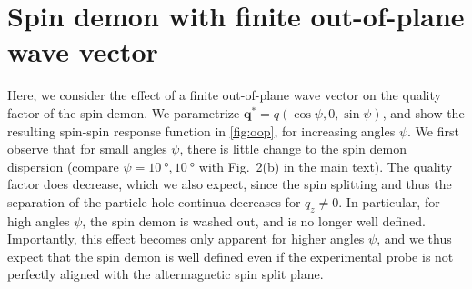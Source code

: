 \documentclass[aps,prb,reprint,twocolumns,superscriptaddress,nofootinbib]{revtex4-2}
\begin{document}
	
	
	\section{Spin demon with finite out-of-plane wave vector}
	Here, we consider the effect of a finite out-of-plane wave vector on the quality factor of the spin demon. We parametrize $\bm q^* = q(\cos\psi,0,\sin\psi)$, and show the resulting spin-spin response function in \cref{fig:oop}, for increasing angles $\psi$. We first observe that for small angles $\psi$, there is little change to the spin demon dispersion (compare $\psi=\SI{10}{\degree},\SI{10}{\degree}$ with Fig.~2(b) in the main text). The quality factor does decrease, which we also expect, since the spin splitting and thus the separation of the particle-hole continua decreases for $q_z\neq0$. In particular, for high angles $\psi$, the spin demon is washed out, and is no longer well defined. Importantly, this effect becomes only apparent for higher angles $\psi$, and we thus expect that the spin demon is well defined even if the experimental probe is not perfectly aligned with the altermagnetic spin split plane.
	
\end{document}
